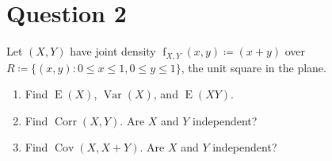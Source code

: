 \documentclass[10pt]{fphw}
\newcommand{\var}{\operatorname{Var}}
\newcommand{\expect}{\operatorname{E}}
\newcommand{\corr}{\operatorname{Corr}}
\newcommand{\cov}{\operatorname{Cov}}
\begin{document}
\section*{Question 2}
\begin{problem}
Let $(X,Y)$ have joint density $\operatorname{f}_{X,Y}(x,y) \coloneqq (x+y)$ over $R \coloneqq \{(x,y) \colon 0 \leq x \leq 1, 0 \leq y \leq 1\}$, the unit square in the plane.
\medskip
\begin{enumerate}
\item Find $\expect(X)$, $\var(X)$, and $\expect(X Y)$.
\item Find $\corr(X,Y)$. Are $X$ and $Y$ independent?
\item Find $\cov(X,X+Y)$. Are $X$ and $Y$ independent?
\end{enumerate}
\end{problem}
	
\end{document}
